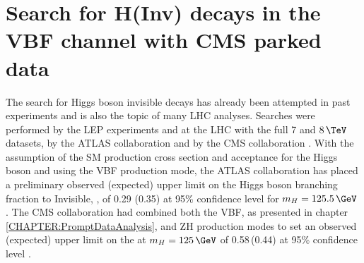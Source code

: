 \chapter{Search for H(Inv) decays in the VBF channel with CMS parked data}
\label{CHAPTER:ParkedDataAnalysis}


%
%
%
%
%
%
%


The search for Higgs boson invisible decays has already been attempted in past experiments and is also the topic of many \gls{LHC} analyses. Searches were performed by the \gls{LEP} experiments \cite{ARTICLE:LEPSearchesForInvisibleHiggsBosons,ARTICLE:LEPDELPHISearchesForInvisibleDecayingHiggsBosons,ARTICLE:LEPOPALSearchForInvisiblyDecayingHiggsBosons} and at the \gls{LHC} with the full 7 and $8\,\TeV$ datasets, by the \gls{ATLAS} collaboration \cite{ARTICLE:ATLASSearchForInvisibleDecaysHiggsBosonAssociatedZ,ARTICLE:ATLASSearchForDarkMatterWithHadronicallyWorZ,ARTICLE:ATLASMonoJetPlusMET,ARTICLE:ATLASVBFHiggsInvConfNote} and by the \gls{CMS} collaboration \cite{ARTICLE:CMSVBFHiggsToInvAndZHCombination}. With the assumption of the \gls{SM} production cross section and acceptance for the Higgs boson and using the \gls{VBF} production mode, the \gls{ATLAS} collaboration has placed a preliminary observed (expected) upper limit on the Higgs boson branching fraction to Invisible, \BRinv, of 0.29 (0.35) at 95\% confidence level for $m_H=125.5\,\GeV$ \cite{ARTICLE:ATLASVBFHiggsInvConfNote}. The \gls{CMS} collaboration had combined both the \gls{VBF}, as presented in chapter \ref{CHAPTER:PromptDataAnalysis}, and ZH production modes to set an observed (expected) upper limit on the \BRinv at  $m_H=125\,\GeV$ of 0.58\,(0.44) at 95\% confidence level \cite{ARTICLE:CMSVBFHiggsToInvAndZHCombination}.

